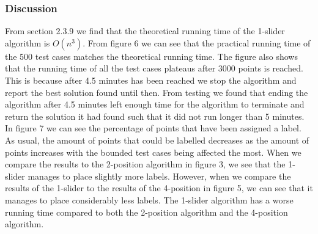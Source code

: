 \documentclass[crop=false,a4paper,oneside,11pt]{standalone}
\begin{document}
\subsubsection{Discussion}
From section 2.3.9 we find that the theoretical running time of the 1-slider algorithm is $O(n^3)$. From figure 6 we can see that the practical running time of the 500 test cases matches the theoretical running time. The figure also shows that the running time of all the test cases plateaus after 3000 points is reached. This is because after 4.5 minutes has been reached we stop the algorithm and report the best solution found until then. From testing we found that ending the algorithm after 4.5 minutes left enough time for the algorithm to terminate and return the solution it had found such that it did not run longer than 5 minutes.\\
In figure 7 we can see the percentage of points that have been assigned a label. As usual, the amount of points that could be labelled decreases as the amount of points increases with the bounded test cases being affected the most.
 When we compare the results to the 2-position algorithm in figure 3, we see that the 1-slider manages to place slightly more labels. However, when we compare the results of the 1-slider to the results of the 4-position in figure 5, we can see that it manages to place considerably less labels. The 1-slider algorithm has a worse running time compared to both the 2-position algorithm and the 4-position algorithm.
\end{document}
